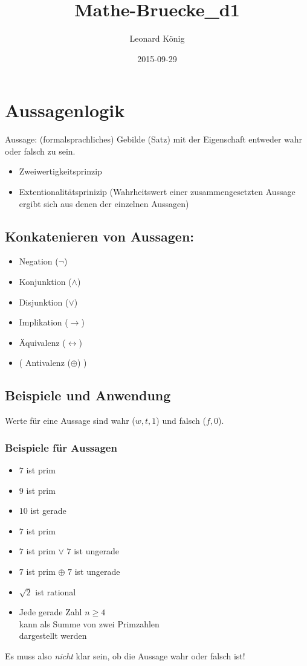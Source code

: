 \documentclass[10pt,a4paper]{article}
\author{Leonard König}
\title{Mathe-Bruecke_d1}
\date{2015-09-29}
\begin{document}
\section{Aussagenlogik}
Aussage: (formalsprachliches) Gebilde (Satz) mit der Eigenschaft entweder wahr oder falsch zu sein.
%
\begin{itemize}
\item Zweiwertigkeitsprinzip
\item Extentionalitätsprinizip (Wahrheitswert einer zusammengesetzten Aussage ergibt sich aus denen der einzelnen Aussagen)
\end{itemize}
%
\subsection{Konkatenieren von Aussagen:}
\begin{itemize}
\item Negation (\( \neg \)) 
\item Konjunktion (\( \land \)) 
\item Disjunktion (\( \lor \)) 
\item Implikation (\( \rightarrow \)) 
\item Äquivalenz (\( \leftrightarrow \)) 
\item ( Antivalenz (\( \oplus \)) ) 
\end{itemize}
%
\subsection{Beispiele und Anwendung}
%
Werte für eine Aussage sind wahr (\( w,t,1 \)) und falsch (\( f,0 \)).
%
\subsubsection{Beispiele für Aussagen}
\begin{itemize}
\item \glqq $7$ ist prim\grqq{}
\item \glqq $9$ ist prim\grqq{}
\item \glqq $10$ ist gerade\grqq{}
\item \glqq $7$ ist prim\grqq{}
\item \glqq $7$ ist prim $\lor$ $7$ ist ungerade\grqq{}
\item \glqq $7$ ist prim $\oplus$ $7$ ist ungerade\grqq{}
\item \glqq $\sqrt{2}$ ist rational\grqq{}
\item \glqq Jede gerade Zahl $n\geq 4$\\
kann als Summe von zwei Primzahlen\\
dargestellt werden\grqq{}
\end{itemize}
%
Es muss also \emph{nicht} klar sein, ob die Aussage wahr oder falsch ist!
%
\end{document}
